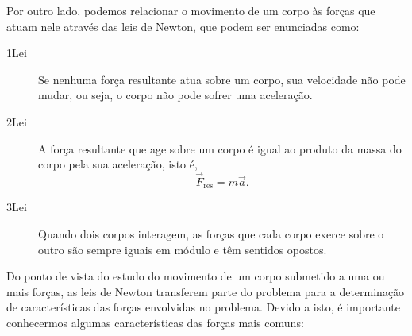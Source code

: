 Por outro lado, podemos relacionar o movimento de um corpo às forças que atuam nele através das leis de Newton, que podem ser enunciadas como:
\begin{description}
	\item[1\textordfeminine Lei] Se nenhuma força resultante atua sobre um corpo, sua velocidade não pode mudar, ou seja, o corpo não pode sofrer uma aceleração.
	\item[2\textordfeminine Lei] A força resultante que age sobre um corpo é igual ao produto da massa do corpo pela sua aceleração, isto é,
		\begin{equation}
			\vec{F}_{\textrm{res}} = m\vec{a}.
		\end{equation}
	\item[3\textordfeminine Lei] Quando dois corpos interagem, as forças que cada corpo exerce sobre o outro são sempre iguais em módulo e têm sentidos opostos.
\end{description}
%
Do ponto de vista do estudo do movimento de um corpo submetido a uma ou mais forças, as leis de Newton transferem parte do problema para a determinação de características das forças envolvidas no problema. Devido a isto, é importante conhecermos algumas características das forças mais comuns:
